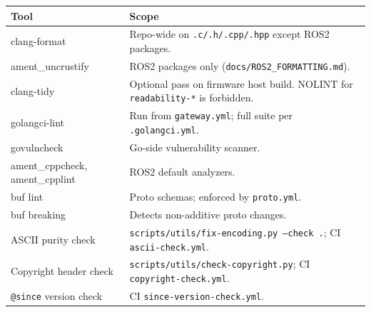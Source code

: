 \begin{center}
\begin{tabular}{|p{4.5cm}|p{10.0cm}|}
\hline
\textbf{Tool}                  & \textbf{Scope}                                                                                                                       \\
\hline
clang-format                   & Repo-wide on \texttt{.c/.h/.cpp/.hpp} except ROS2 packages.                                                                            \\
ament\_uncrustify              & ROS2 packages only (\texttt{docs/ROS2\_FORMATTING.md}).                                                                              \\
clang-tidy                     & Optional pass on firmware host build. NOLINT for \texttt{readability-*} is forbidden.                                                  \\
golangci-lint                  & Run from \texttt{gateway.yml}; full suite per \texttt{.golangci.yml}.                                                                \\
govulncheck                    & Go-side vulnerability scanner.                                                                                                        \\
ament\_cppcheck, ament\_cpplint & ROS2 default analyzers.                                                                                                              \\
buf lint                       & Proto schemas; enforced by \texttt{proto.yml}.                                                                                        \\
buf breaking                   & Detects non-additive proto changes.                                                                                                   \\
ASCII purity check             & \texttt{scripts/utils/fix-encoding.py --check .}; CI \texttt{ascii-check.yml}.                                                       \\
Copyright header check         & \texttt{scripts/utils/check-copyright.py}; CI \texttt{copyright-check.yml}.                                                          \\
\texttt{@since} version check  & CI \texttt{since-version-check.yml}.                                                                                                  \\
\hline
\end{tabular}
\end{center}

